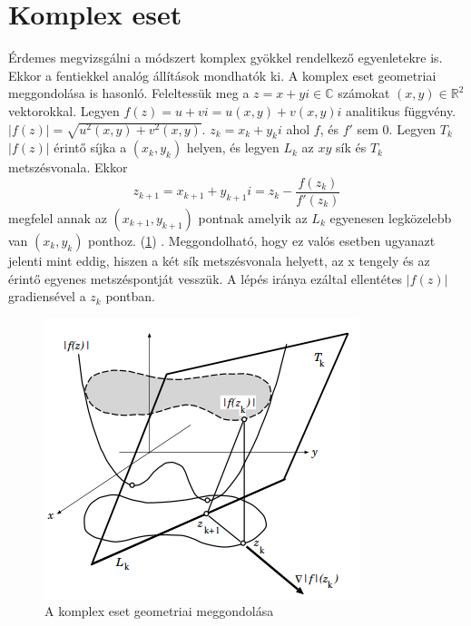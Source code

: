 \documentclass[a4paper,12pt]{report}
\begin{document}


		\section{Komplex eset}
            Érdemes megvizsgálni a módszert komplex gyökkel rendelkező egyenletekre is. Ekkor a fentiekkel analóg állítások mondhatók ki. A komplex eset geometriai meggondolása is hasonló. Feleltessük meg a $z=x+yi \in \mathbb{C}$ számokat $(x,y)\in\mathbb{R}^2$ vektorokkal. Legyen $f(z)=u+vi=u(x,y)+v(x,y)i$ analitikus függvény. $|f(z)|=\sqrt{u^2(x,y)+v^2(x,y)}$. $z_k=x_k+y_ki$ ahol $f$, és $f'$ sem 0. Legyen $T_k$ $|f(z)|$ érintő síjka a $(x_k,y_k)$ helyen, és legyen $L_k$ az $xy$ sík és $T_k$ metszésvonala. Ekkor \[z_{k+1}=x_{k+1}+y_{k+1}i=z_k-\frac{f(z_k)}{f'(z_k)}\] megfelel annak az $(x_{k+1},y_{k+1})$ pontnak amelyik az $L_k$ egyenesen legközelebb van $(x_k,y_k)$ ponthoz. (\ref{k6}) \cite[p. 809]{Yau98}. Meggondolható, hogy ez valós esetben ugyanazt jelenti mint eddig, hiszen a két sík metszésvonala helyett, az x tengely és az érintő egyenes metszéspontját vesszük. A lépés iránya ezáltal ellentétes $|f(z)|$ gradiensével a $z_k$ pontban.
            \begin{figure}[htp]
				\begin{center}
				\includegraphics[scale=0.7]{kep6.png}
				\caption{A komplex eset geometriai meggondolása \cite[p. 807]{Yau98}} \label{k6}
				\end{center}
			\end{figure}
            
\end{document}
